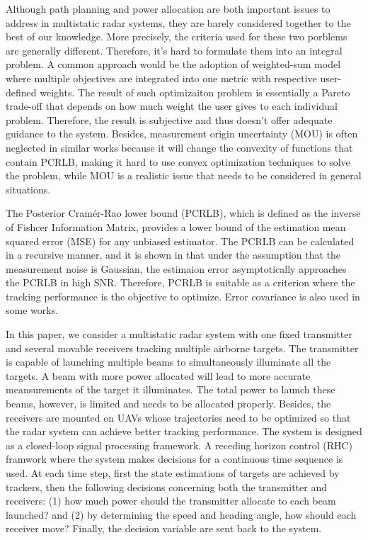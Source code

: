 \documentclass[12pt,journal,draftclsnofoot,onecolumn]{IEEEtran}
\begin{document}
Although path planning and power allocation are both important issues to address in multistatic radar systems, they are barely considered together to the best of our knowledge. More precisely, the criteria used for these two porblems are generally different. Therefore, it's hard to formulate them into an integral problem. A common approach would be the adoption of weighted-sum model where multiple objectives are integrated into one metric with respective user-defined weights. The result of such optimizaiton problem is essentially a Pareto trade-off that depends on how much weight the user gives to each individual problem. Therefore, the result is subjective and thus doesn't offer adequate guidance to the system. Besides, measurement origin uncertainty (MOU) is often neglected in similar works because it will change the convexity of functions that contain PCRLB, making it hard to use convex optimization techniques to solve the problem, while MOU is a realistic issue that needs to be considered in general situations.

The Posterior Cramér-Rao lower bound (PCRLB), which is defined as the inverse of Fishcer Information Matrix, provides a lower bound of the estimation mean squared error (MSE) for any unbiased estimator. The PCRLB can be calculated in a recursive manner\cite{tichavsky1998posterior}, and it is shown in\cite{niu2012target} that under the assumption that the measurement noise is Gaussian, the estimaion error asymptotically approaches the PCRLB in high SNR. Therefore, PCRLB is suitable as a criterion where the tracking performance is the objective to optimize\cite{hernandez2004multisensor,tharmarasa2007pcrlb,punithakumar2006multisensor}. Error covariance is also used in some works\cite{douganccay2010single}. 

In this paper, we consider a multistatic radar system with one fixed transmitter and several movable receivers tracking multiple airborne targets. The transmitter is capable of launching multiple beams to simultaneously illuminate all the targets. A beam with more power allocated will lead to more accurate meansurements of the target it illuminates. The total power to launch these beams, however, is limited and needs to be allocated properly. Besides, the receivers are mounted on UAVs whose trajectories need to be optimized so that the radar system can achieve better tracking performance. The system is designed as a closed-loop signal processing framework. A receding horizon control (RHC) framwork\cite{frew2005receding} where the system makes decisions for a continuous time sequence is used. At each time step, first the state estimations of targets are achieved by trackers, then the following decisions concerning both the transmitter and receivers: (1) how much power should the transmitter allocate to each beam launched? and (2) by determining the speed and heading angle, how should each receiver move? Finally, the decision variable are sent back to the system.
\end{document}
